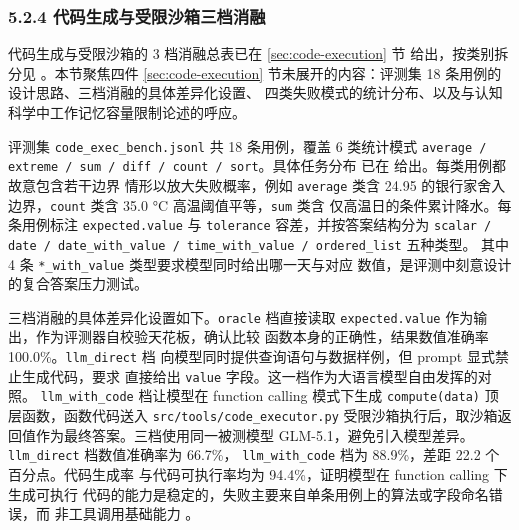 
\subsubsection*{5.2.4 \quad 代码生成与受限沙箱三档消融}
\label{sec:code-eval}

代码生成与受限沙箱的 3 档消融总表已在 \ref{sec:code-execution} 节
 给出，按类别拆分见
。本节聚焦四件 \ref{sec:code-execution}
节未展开的内容：评测集 18 条用例的设计思路、三档消融的具体差异化设置、
四类失败模式的统计分布、以及与认知科学中工作记忆容量限制论述的呼应。

评测集 \texttt{code\_\bk{}exec\_\bk{}bench.\bk{}jsonl} 共 18 条用例，覆盖 6 类统计模式
\texttt{average /\bk{} extreme /\bk{} sum /\bk{} diff /\bk{} count /\bk{} sort}。具体任务分布
已在  给出。每类用例都故意包含若干边界
情形以放大失败概率，例如 \texttt{average} 类含 24.95 的银行家舍入
边界，\texttt{count} 类含 35.0 °C 高温阈值平等，\texttt{sum} 类含
仅高温日的条件累计降水。每条用例标注 \texttt{expected.\bk{}value} 与
\texttt{tolerance} 容差，并按答案结构分为 \texttt{scalar /\bk{} date /\bk{}
date\_\bk{}with\_\bk{}value /\bk{} time\_\bk{}with\_\bk{}value /\bk{} ordered\_\bk{}list} 五种类型。
其中 4 条 \texttt{*\_\bk{}with\_\bk{}value} 类型要求模型同时给出哪一天与对应
数值，是评测中刻意设计的复合答案压力测试。

三档消融的具体差异化设置如下。\texttt{oracle} 档直接读取
\texttt{expected.\bk{}value} 作为输出，作为评测器自校验天花板，确认比较
函数本身的正确性，结果数值准确率 100.0\%。\texttt{llm\_\bk{}direct} 档
向模型同时提供查询语句与数据样例，但 prompt 显式禁止生成代码，要求
直接给出 \texttt{value} 字段。这一档作为大语言模型自由发挥的对照。
\texttt{llm\_\bk{}with\_\bk{}code} 档让模型在 function calling 模式下生成
\texttt{compute(data)} 顶层函数，函数代码送入 \texttt{src/\bk{}tools/\bk{}code\_\bk{}executor.\bk{}py}
受限沙箱执行后，取沙箱返回值作为最终答案。三档使用同一被测模型
GLM-5.1，避免引入模型差异。\texttt{llm\_\bk{}direct} 档数值准确率为 66.7\%，
\texttt{llm\_\bk{}with\_\bk{}code} 档为 88.9\%，差距 22.2 个百分点。代码生成率
与代码可执行率均为 94.4\%，证明模型在 function calling 下生成可执行
代码的能力是稳定的，失败主要来自单条用例上的算法或字段命名错误，而
非工具调用基础能力 \cite{ref29}。

